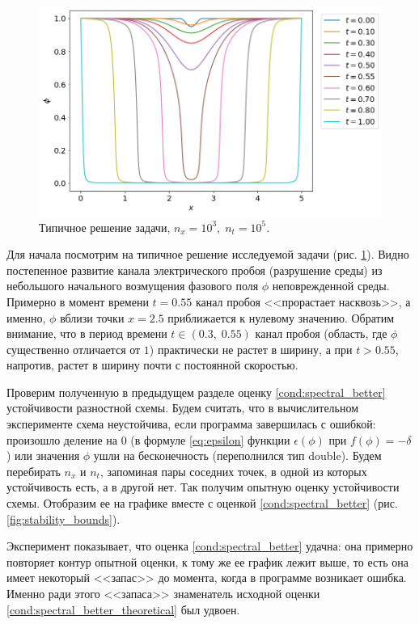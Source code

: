 \begin{figure}[!tp]
    \centering
    \includegraphics[width=\textwidth]{figures/typical_solution.png}
    \vspace{-0.8cm}
    \caption{Типичное решение задачи, $n_x = 10^3, \; n_t = 10^5$.}
    \label{fig:typical_solution}
\end{figure}

Для начала посмотрим на типичное решение исследуемой задачи (рис. \ref{fig:typical_solution}). Видно постепенное развитие канала электрического пробоя (разрушение среды) из небольшого начального возмущения фазового поля $\phi$ неповрежденной среды. Примерно в момент времени $t = 0.55$ канал пробоя <<прорастает насквозь>>, а именно, $\phi$ вблизи точки $x = 2.5$ приближается к нулевому значению. Обратим внимание, что в период времени $t \in (0.3, \; 0.55)$ канал пробоя (область, где $\phi$ существенно отличается от $1$) практически не растет в ширину, а при $t > 0.55$, напротив, растет в ширину почти с постоянной скоростью.

Проверим полученную в предыдущем разделе оценку \eqref{cond:spectral_better} устойчивости разностной схемы. Будем считать, что в вычислительном эксперименте схема неустойчива, если программа завершилась с ошибкой: произошло деление на $0$ (в формуле \eqref{eq:epsilon} функции $\epsilon(\phi)$ при $f(\phi) = -\delta$) или значения $\phi$ ушли на бесконечность (переполнился тип double). Будем перебирать $n_x$ и $n_t$, запоминая пары соседних точек, в одной из которых устойчивость есть, а в другой нет. Так получим опытную оценку устойчивости схемы. Отобразим ее на графике вместе с оценкой \eqref{cond:spectral_better} (рис. \ref{fig:stability_bounds}).

Эксперимент показывает, что оценка \eqref{cond:spectral_better} удачна: она примерно повторяет контур опытной оценки, к тому же ее график лежит выше, то есть она имеет некоторый <<запас>> до момента, когда в программе возникает ошибка. Именно ради этого <<запаса>> знаменатель исходной оценки  \eqref{cond:spectral_better_theoretical} был удвоен.

